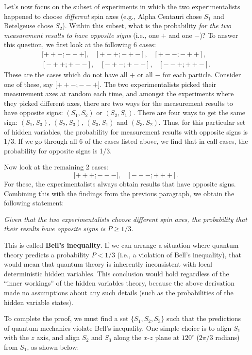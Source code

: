 \documentclass[pra,12pt]{revtex4}
\begin{document}
Let's now focus on the subset of experiments in which the two
experimentalists happened to choose \textit{different} spin axes
(e.g., Alpha Centauri chose $S_1$ and Betelgeuse chose $S_2$).  Within
this subset, what is the probability \textit{for the two measurement
  results to have opposite signs} (i.e., one $+$ and one $-$)?  To
answer this question, we first look at the following 6 cases:
$$\begin{aligned}{[}{++-};{--+}], \;\;\; [{+-+};{-+-}], \;\;\; [{+--};{-++}],\\ [{-++};{+--}], \;\;\; [{-+-};{+-+}], \;\;\; [{--+};{++-}].\end{aligned}$$
These are the cases which do not have all $+$ or all $-$ for each
particle.  Consider one of these, say ${[}{++-};{--+}]$.  The two
experimentalists picked their measurement axes at random each time,
and amongst the experiments where they picked different axes, there
are two ways for the measurement results to have opposite signs:
$(S_1,S_2)$ or $(S_2,S_1)$.  There are four ways to get the same sign:
$(S_1,S_3)$, $(S_2,S_3)$, $(S_3,S_1)$ and $(S_3, S_2)$.  Thus,
for this particular set of hidden variables, the probability for
measurement results with opposite signs is 1/3.  If we go through all
6 of the cases listed above, we find that in call cases, the
probability for opposite signs is 1/3.

Now look at the remaining 2 cases:
$${[}{+++};{---}], \;\;\; [{---};{+++}].$$
For these, the experimentalists always obtain results that have
opposite signs.  Combining this with the findings from the previous
paragraph, we obtain the following statement:

\textit{Given that the two experimentalists choose different spin
  axes, the probability that their results have opposite signs is $P
  \ge 1/3$.}

This is called \textbf{Bell's inequality}.  If we can arrange a
situation where quantum theory predicts a probability $P < 1/3$ (i.e.,
a violation of Bell's inequality), that would mean that quantum theory
is inherently inconsistent with local deterministic hidden variables.
This conclusion would hold regardless of the ``inner workings'' of the
hidden variables theory, because the above derivation made no
assumptions about any such details (such as the probabilities of the
hidden variable states).

To complete the proof, we must find a set $\{S_1, S_2, S_3\}$ such
that the predictions of quantum mechanics violate Bell's inequality.
One simple choice is to align $S_1$ with the $z$ axis, and align $S_2$
and $S_3$ along the $x$-$z$ plane at $120^\circ$ ($2\pi/3$ radians)
from $S_1$, as shown below:
\end{document}
